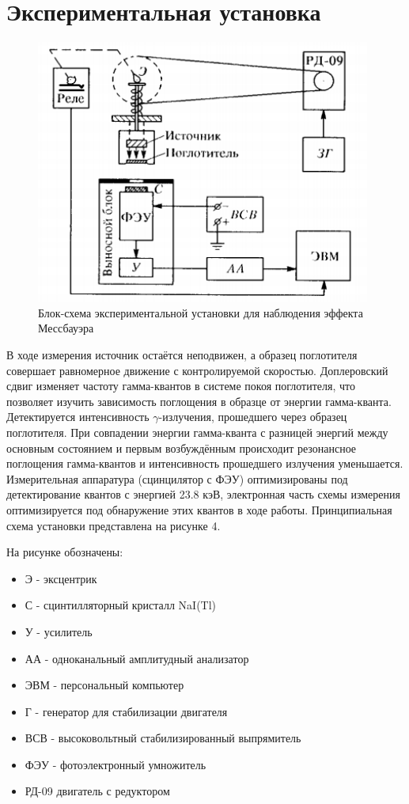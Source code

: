 \documentclass[a4paper]{article}
\begin{document}
\section{Экспериментальная установка}

\begin{figure}[h]
    \centering
    \includegraphics[width=11cm]{fig1.PNG}
    \caption{Блок-схема экспериментальной установки для наблюдения эффекта Мессбауэра}
    \label{fig:vac}
\end{figure}

В ходе измерения источник остаётся неподвижен, а образец
поглотителя совершает равномерное движение с
контролируемой скоростью. Доплеровский сдвиг изменяет
частоту гамма-квантов в системе покоя поглотителя, что
позволяет изучить зависимость поглощения в образце от
энергии гамма-кванта. Детектируется интенсивность $\gamma$-излучения,
прошедшего через образец поглотителя. При
совпадении энергии гамма-кванта с разницей энергий
между основным состоянием и первым возбуждённым
происходит резонансное поглощения гамма-квантов и
интенсивность прошедшего излучения уменьшается.
Измерительная аппаратура (сцинцилятор с ФЭУ) оптимизированы под детектирование
квантов с энергией 23.8 кэВ, электронная часть схемы измерения оптимизируется под
обнаружение этих квантов в ходе работы. Принципиальная схема установки представлена на рисунке 4. \par
На рисунке обозначены:
\begin{itemize}
    \item Э - эксцентрик
    \item С - сцинтилляторный кристалл NaI(Tl)
    \item У - усилитель
    \item АА - одноканальный амплитудный анализатор
    \item ЭВМ - персональный компьютер
    \item Г - генератор для стабилизации двигателя
    \item ВСВ - высоковольтный стабилизированный выпрямитель
    \item ФЭУ - фотоэлектронный умножитель
    \item РД-09 двигатель с редуктором
\end{itemize}
\end{document}
